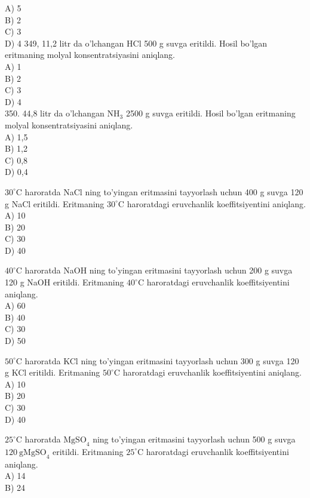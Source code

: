 A) 5\\
B) 2\\
C) 3\\
D) 4
349, 11,2 litr da o'lchangan HCl 500 g suvga eritildi. Hosil bo'lgan eritmaning molyal konsentratsiyasini aniqlang.\\
A) 1\\
B) 2\\
C) 3\\
D) 4\\
350. 44,8 litr da o'lchangan $\mathrm{NH}_{3}$ 2500 g suvga eritildi. Hosil bo'lgan eritmaning molyal konsentratsiyasini aniqlang.\\
A) 1,5\\
B) 1,2\\
C) 0,8\\
D) 0,4
  \item $30^{\circ} \mathrm{C}$ haroratda NaCl ning to'yingan eritmasini tayyorlash uchun 400 g suvga 120 g NaCl eritildi. Eritmaning $30^{\circ} \mathrm{C}$ haroratdagi eruvchanlik koeffitsiyentini aniqlang.\\
A) 10\\
B) 20\\
C) 30\\
D) 40\\
  \item $40^{\circ} \mathrm{C}$ haroratda NaOH ning to'yingan eritmasini tayyorlash uchun 200 g suvga 120 g NaOH eritildi. Eritmaning $40^{\circ} \mathrm{C}$ haroratdagi eruvchanlik koeffitsiyentini aniqlang.\\
A) 60\\
B) 40\\
C) 30\\
D) 50
  \item $50^{\circ} \mathrm{C}$ haroratda KCl ning to'yingan eritmasini tayyorlash uchun 300 g suvga 120 g KCl eritildi. Eritmaning $50^{\circ} \mathrm{C}$ haroratdagi eruvchanlik koeffitsiyentini aniqlang.\\
A) 10\\
B) 20\\
C) 30\\
D) 40
  \item $25^{\circ} \mathrm{C}$ haroratda $\mathrm{MgSO}_{4}$ ning to'yingan eritmasini tayyorlash uchun 500 g suvga $120 \mathrm{~g} \mathrm{MgSO}_{4}$ eritildi. Eritmaning $25^{\circ} \mathrm{C}$ haroratdagi eruvchanlik koeffitsiyentini aniqlang.\\
A) 14\\
B) 24\\
